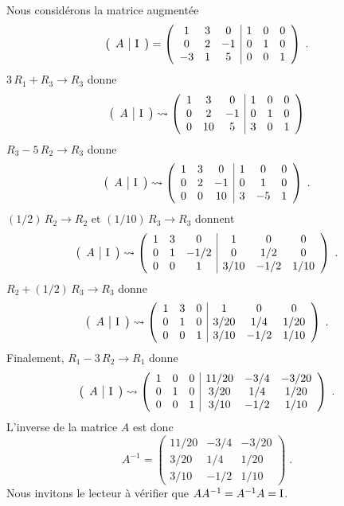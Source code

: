 {\begin{egg}
Nous considérons la matrice augmentée
\[
\left(\begin{array}{c|c}{A}&{\operatorname{I}}\end{array}\right) =
\left(
\begin{array}{ccc|ccc}
1 & 3 & 0 & 1 & 0 & 0 \\
0 & 2 & -1 & 0 & 1 & 0 \\
-3 & 1 & 5 & 0 & 0 & 1
\end{array}
\right) \; .
\]
$3\, R_1 + R_3 \to R_3$ donne
\[
\left(\begin{array}{c|c}{A}&{\operatorname{I}}\end{array}\right) \rightsquigarrow
\left(
\begin{array}{ccc|ccc}
1 & 3 & 0 & 1 & 0 & 0 \\
0 & 2 & -1 & 0 & 1 & 0 \\
0 & 10 & 5 & 3 & 0 & 1
\end{array}
\right)
\]
$R_3 - 5\,R_2 \to R_3$ donne
\[
\left(\begin{array}{c|c}{A}&{\operatorname{I}}\end{array}\right) \rightsquigarrow
\left(
\begin{array}{ccc|ccc}
1 & 3 & 0 & 1 & 0 & 0 \\
0 & 2 & -1 & 0 & 1 & 0 \\
0 & 0 & 10 & 3 & -5 & 1
\end{array}
\right)\; .
\]
$(1/2) \, R_2 \to R_2$ et $(1/10)\,R_3 \to R_3$ donnent
\[
\left(\begin{array}{c|c}{A}&{\operatorname{I}}\end{array}\right) \rightsquigarrow
\left(
\begin{array}{ccc|ccc}
1 & 3 & 0 & 1 & 0 & 0 \\
0 & 1 & -1/2 & 0 & 1/2 & 0 \\
0 & 0 & 1 & 3/10 & -1/2 & 1/10
\end{array}
\right) \; .
\]
$R_2 + (1/2) \, R_3 \to R_3$ donne
\[
\left(\begin{array}{c|c}{A}&{\operatorname{I}}\end{array}\right) \rightsquigarrow
\left(
\begin{array}{ccc|ccc}
1 & 3 & 0 & 1 & 0 & 0 \\
0 & 1 & 0 & 3/20 & 1/4 & 1/20 \\
0 & 0 & 1 & 3/10 & -1/2 & 1/10
\end{array}
\right) \; .
\]
Finalement, $R_1 - 3\,R_2 \to R_1$ donne
\[
\left(\begin{array}{c|c}{A}&{\operatorname{I}}\end{array}\right) \rightsquigarrow
\left(
\begin{array}{ccc|ccc}
1 & 0 & 0 & 11/20 & -3/4 & -3/20 \\
0 & 1 & 0 & 3/20 & 1/4 & 1/20 \\
0 & 0 & 1 & 3/10 & -1/2 & 1/10
\end{array}
\right) \; .
\]
L'inverse de la matrice $A$ est donc
\[
A^{-1} = \begin{pmatrix}
11/20 & -3/4 & -3/20 \\
3/20 & 1/4 & 1/20 \\
3/10 & -1/2 & 1/10
\end{pmatrix} \; .
\]
Nous invitons le lecteur à vérifier que $A A^{-1} = A^{-1} A = \operatorname{I}$.
\end{egg}

}
